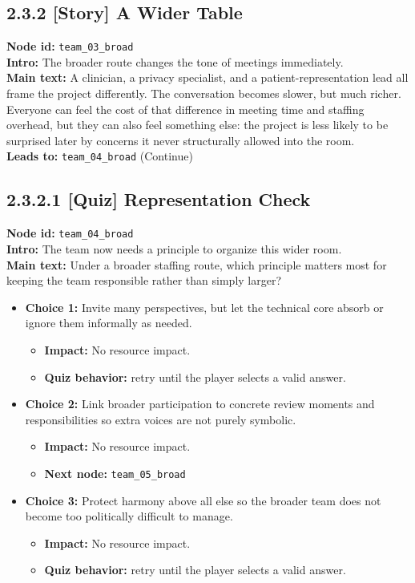 \documentclass[11pt]{article}
\begin{document}
\subsection*{2.3.2 [Story] A Wider Table}
\textbf{Node id:} \texttt{team\_03\_broad}\\
\textbf{Intro:} The broader route changes the tone of meetings immediately.\\
\textbf{Main text:} A clinician, a privacy specialist, and a patient-representation lead all frame the project differently. The conversation becomes slower, but much richer. Everyone can feel the cost of that difference in meeting time and staffing overhead, but they can also feel something else: the project is less likely to be surprised later by concerns it never structurally allowed into the room.\\
\textbf{Leads to:} \texttt{team\_04\_broad} (Continue)\\
\subsection*{2.3.2.1 [Quiz] Representation Check}
\textbf{Node id:} \texttt{team\_04\_broad}\\
\textbf{Intro:} The team now needs a principle to organize this wider room.\\
\textbf{Main text:} Under a broader staffing route, which principle matters most for keeping the team responsible rather than simply larger?\\
\begin{itemize}
\item \textbf{Choice 1:} Invite many perspectives, but let the technical core absorb or ignore them informally as needed.
\begin{itemize}
\item \textbf{Impact:} No resource impact.
\item \textbf{Quiz behavior:} retry until the player selects a valid answer.
\end{itemize}
\item \textbf{Choice 2:} Link broader participation to concrete review moments and responsibilities so extra voices are not purely symbolic.
\begin{itemize}
\item \textbf{Impact:} No resource impact.
\item \textbf{Next node:} \texttt{team\_05\_broad}
\end{itemize}
\item \textbf{Choice 3:} Protect harmony above all else so the broader team does not become too politically difficult to manage.
\begin{itemize}
\item \textbf{Impact:} No resource impact.
\item \textbf{Quiz behavior:} retry until the player selects a valid answer.
\end{itemize}
\end{itemize}
\end{document}
